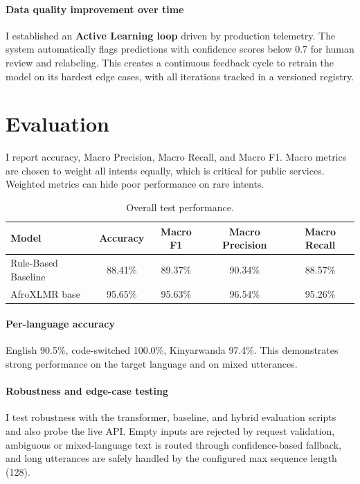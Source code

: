 \documentclass[11pt]{article}
\begin{document}
\paragraph{Data quality improvement over time}
I established an \textbf{Active Learning loop} driven by production telemetry. The system automatically flags predictions with confidence scores below 0.7 for human review and relabeling. This creates a continuous feedback cycle to retrain the model on its hardest edge cases, with all iterations tracked in a versioned registry.


\section*{Evaluation}
I report accuracy, Macro Precision, Macro Recall, and Macro F1. Macro metrics are chosen to weight all intents equally, which is critical for public services. Weighted metrics can hide poor performance on rare intents.

\begin{table}[h]
\centering
\begin{tabular}{lcccc}
\toprule
Model & Accuracy & Macro F1 & Macro Precision & Macro Recall \\
\midrule
Rule-Based Baseline & 88.41\% & 89.37\% & 90.34\% & 88.57\% \\
AfroXLMR base & 95.65\% & 95.63\% & 96.54\% & 95.26\% \\
\bottomrule
\end{tabular}
\caption{Overall test performance.}
\end{table}

\paragraph{Per-language accuracy}
English 90.5\%, code-switched 100.0\%, Kinyarwanda 97.4\%. This demonstrates strong performance on the target language and on mixed utterances.

\paragraph{Robustness and edge-case testing}
I test robustness with the transformer, baseline, and hybrid evaluation scripts and also probe the live API. Empty inputs are rejected by request validation, ambiguous or mixed-language text is routed through confidence-based fallback, and long utterances are safely handled by the configured max sequence length (128).
\end{document}
